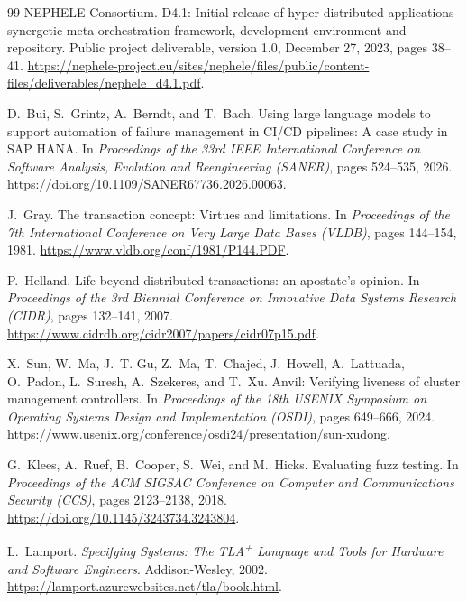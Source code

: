 \begin{thebibliography}{99}
NEPHELE Consortium.
D4.1: Initial release of hyper-distributed applications synergetic
meta-orchestration framework, development environment and repository.
Public project deliverable, version 1.0, December 27, 2023, pages 38--41.
\url{https://nephele-project.eu/sites/nephele/files/public/content-files/deliverables/nephele_d4.1.pdf}.

D.~Bui, S.~Grintz, A.~Berndt, and T.~Bach.
Using large language models to support automation of failure management in
CI/CD pipelines: A case study in SAP HANA.
In \emph{Proceedings of the 33rd IEEE International Conference on Software
Analysis, Evolution and Reengineering (SANER)}, pages 524--535, 2026.
\url{https://doi.org/10.1109/SANER67736.2026.00063}.

J.~Gray.
The transaction concept: Virtues and limitations.
In \emph{Proceedings of the 7th International Conference on Very Large
Data Bases (VLDB)}, pages 144--154, 1981.
\url{https://www.vldb.org/conf/1981/P144.PDF}.

P.~Helland.
Life beyond distributed transactions: an apostate's opinion.
In \emph{Proceedings of the 3rd Biennial Conference on Innovative Data
Systems Research (CIDR)}, pages 132--141, 2007.
\url{https://www.cidrdb.org/cidr2007/papers/cidr07p15.pdf}.

X.~Sun, W.~Ma, J.~T. Gu, Z.~Ma, T.~Chajed, J.~Howell, A.~Lattuada,
O.~Padon, L.~Suresh, A.~Szekeres, and T.~Xu.
Anvil: Verifying liveness of cluster management controllers.
In \emph{Proceedings of the 18th USENIX Symposium on Operating Systems
Design and Implementation (OSDI)}, pages 649--666, 2024.
\url{https://www.usenix.org/conference/osdi24/presentation/sun-xudong}.

G.~Klees, A.~Ruef, B.~Cooper, S.~Wei, and M.~Hicks.
Evaluating fuzz testing.
In \emph{Proceedings of the ACM SIGSAC Conference on Computer and
Communications Security (CCS)}, pages 2123--2138, 2018.
\url{https://doi.org/10.1145/3243734.3243804}.

L.~Lamport.
\emph{Specifying Systems: The TLA\textsuperscript{+} Language and
Tools for Hardware and Software Engineers}.
Addison-Wesley, 2002.
\url{https://lamport.azurewebsites.net/tla/book.html}.

\end{thebibliography}
